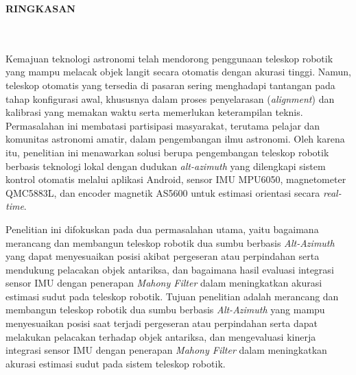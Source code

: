 \clearpage
{}%
\thispagestyle{fancy}

\begin{center}
	\large \bfseries \MakeUppercase{Ringkasan}\\
	\normalsize \normalfont {\thetitle}\\
	\normalsize \normalfont {\theauthor}\\
	\bigskip
	
	\normalsize \normalfont \justifying
	\normalsize \normalfont \justifying
	Kemajuan teknologi astronomi telah mendorong penggunaan teleskop robotik yang mampu melacak objek langit secara otomatis dengan akurasi tinggi. Namun, teleskop otomatis yang tersedia di pasaran sering menghadapi tantangan pada tahap konfigurasi awal, khususnya dalam proses penyelarasan (\textit{alignment}) dan kalibrasi yang memakan waktu serta memerlukan keterampilan teknis. Permasalahan ini membatasi partisipasi masyarakat, terutama pelajar dan komunitas astronomi amatir, dalam pengembangan ilmu astronomi. Oleh karena itu, penelitian ini menawarkan solusi berupa pengembangan teleskop robotik berbasis teknologi lokal dengan dudukan \textit{alt-azimuth} yang dilengkapi sistem kontrol otomatis melalui aplikasi Android, sensor IMU MPU6050, magnetometer QMC5883L, dan encoder magnetik AS5600 untuk estimasi orientasi secara \textit{real-time}.\par
	
	Penelitian ini difokuskan pada dua permasalahan utama, yaitu bagaimana merancang dan membangun teleskop robotik dua sumbu berbasis \textit{Alt-Azimuth} yang dapat menyesuaikan posisi akibat pergeseran atau perpindahan serta mendukung pelacakan objek antariksa, dan bagaimana hasil evaluasi integrasi sensor IMU dengan penerapan \textit{Mahony Filter} dalam meningkatkan akurasi estimasi sudut pada teleskop robotik. Tujuan penelitian adalah merancang dan membangun teleskop robotik dua sumbu berbasis \textit{Alt-Azimuth} yang mampu menyesuaikan posisi saat terjadi pergeseran atau perpindahan serta dapat melakukan pelacakan terhadap objek antariksa, dan mengevaluasi kinerja integrasi sensor IMU dengan penerapan \textit{Mahony Filter} dalam meningkatkan akurasi estimasi sudut pada sistem teleskop robotik.\par
	

\end{center}
